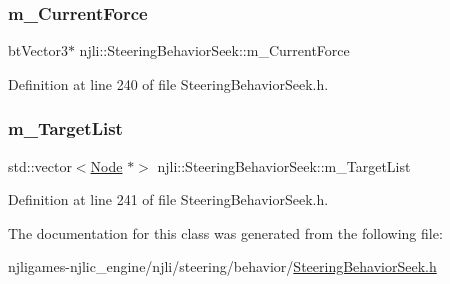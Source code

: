 \subsubsection{\texorpdfstring{m\+\_\+\+Current\+Force}{m\_CurrentForce}}
{\footnotesize\ttfamily bt\+Vector3$\ast$ njli\+::\+Steering\+Behavior\+Seek\+::m\+\_\+\+Current\+Force\hspace{0.3cm}{\ttfamily [private]}}



Definition at line 240 of file Steering\+Behavior\+Seek.\+h.

\mbox{\label{classnjli_1_1_steering_behavior_seek_a76ef2bc86a59cbbba22ab57c0d0ffce9}} 
\subsubsection{\texorpdfstring{m\+\_\+\+Target\+List}{m\_TargetList}}
{\footnotesize\ttfamily std\+::vector$<$\mbox{\hyperlink{classnjli_1_1_node}{Node}} $\ast$$>$ njli\+::\+Steering\+Behavior\+Seek\+::m\+\_\+\+Target\+List\hspace{0.3cm}{\ttfamily [private]}}



Definition at line 241 of file Steering\+Behavior\+Seek.\+h.



The documentation for this class was generated from the following file\+:\begin{DoxyCompactItemize}
\item 
njligames-\/njlic\+\_\+engine/njli/steering/behavior/\mbox{\hyperlink{_steering_behavior_seek_8h}{Steering\+Behavior\+Seek.\+h}}\end{DoxyCompactItemize}
